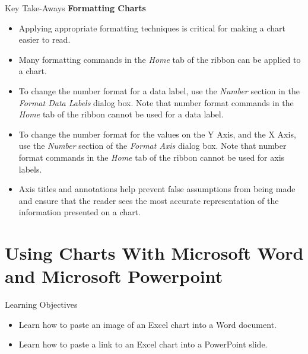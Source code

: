 \begin{center}
	\begin{tkwbox}{Key Take-Aways}
		\textbf{Formatting Charts}
		\\
		\begin{itemize}
			\setlength{\itemsep}{0pt}
			\setlength{\parskip}{0pt}
			\setlength{\parsep}{0pt}

			\item Applying appropriate formatting techniques is critical for making a chart easier to read.
			\item Many formatting commands in the \textit{Home} tab of the ribbon can be applied to a chart.
			\item To change the number format for a data label, use the \textit{Number} section in the \textit{Format Data Labels} dialog box. Note that number format commands in the \textit{Home} tab of the ribbon cannot be used for a data label.
			\item To change the number format for the values on the Y Axis, and the X Axis, use the \textit{Number} section of the \textit{Format Axis} dialog box. Note that number format commands in the \textit{Home} tab of the ribbon cannot be used for axis labels.
			\item Axis titles and annotations help prevent false assumptions from being made and ensure that the reader sees the most accurate representation of the information presented on a chart.
			
		\end{itemize}
	\end{tkwbox}
\end{center}

\section{Using Charts With Microsoft Word and Microsoft Powerpoint}

\begin{center}
	\begin{objbox}{Learning Objectives}
		\begin{itemize}
			\setlength{\itemsep}{0pt}
			\setlength{\parskip}{0pt}
			\setlength{\parsep}{0pt}

			\item Learn how to paste an image of an Excel chart into a Word document.
			\item Learn how to paste a link to an Excel chart into a PowerPoint slide.
			
		\end{itemize}
	\end{objbox}
\end{center}

